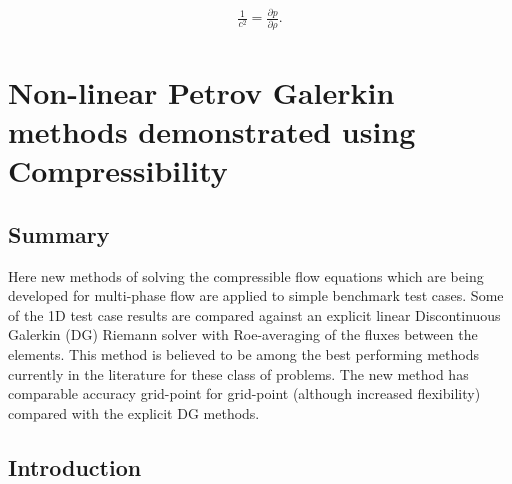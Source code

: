 \begin{eqnarray}
\frac{1}{c^2} = \frac{\partial p}{\partial \rho}. 
\label{c-def}
\end{eqnarray}











\vfill\eject



\section{Non-linear Petrov Galerkin methods demonstrated using Compressibility} 










\subsection{Summary}
Here new methods of solving the compressible flow equations 
which are being developed for multi-phase flow are 
applied to simple benchmark test cases. Some of the 1D 
test case results are compared against an explicit linear Discontinuous 
Galerkin (DG) Riemann solver with Roe-averaging of 
the fluxes between the elements. 
This method  
is believed to be among the best performing methods  
currently in the literature for these class of problems. 
The new method has comparable accuracy grid-point for grid-point 
(although 
increased flexibility) compared with the explicit DG methods. 



\subsection{Introduction}

